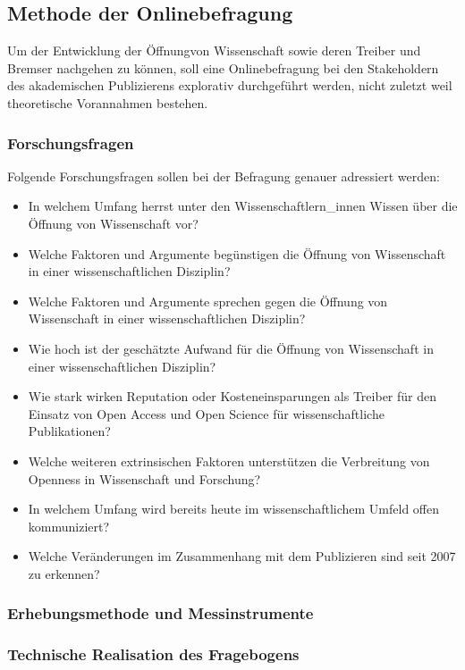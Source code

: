 \subsection{Methode der Onlinebefragung}
Um der Entwicklung der Öffnungvon Wissenschaft sowie deren Treiber und Bremser nachgehen zu können, soll eine Onlinebefragung bei den Stakeholdern des akademischen Publizierens explorativ durchgeführt werden, nicht zuletzt weil theoretische Vorannahmen bestehen.

\subsubsection{Forschungsfragen}
Folgende Forschungsfragen sollen bei der Befragung genauer adressiert werden:
\begin{itemize}
\item In welchem Umfang herrst unter den Wissenschaftlern_innen Wissen über die Öffnung von Wissenschaft vor? 
\item Welche Faktoren und Argumente begünstigen die Öffnung von Wissenschaft in einer wissenschaftlichen Disziplin? 
\item Welche Faktoren und Argumente sprechen gegen die Öffnung von Wissenschaft in einer wissenschaftlichen Disziplin? 
\item Wie hoch ist der geschätzte Aufwand für die Öffnung von Wissenschaft in einer wissenschaftlichen Disziplin? 
\item Wie stark wirken Reputation oder Kosteneinsparungen als Treiber für den Einsatz von Open Access und Open Science für wissenschaftliche Publikationen? 
\item Welche weiteren extrinsischen Faktoren unterstützen die Verbreitung von Openness in Wissenschaft und Forschung? 
\item In welchem Umfang wird bereits heute im wissenschaftlichem Umfeld offen kommuniziert?
\item Welche Veränderungen im Zusammenhang mit dem Publizieren sind seit 2007 zu erkennen?
\end{itemize}

\subsubsection{Erhebungsmethode und Messinstrumente}
\subsubsection{Technische Realisation des Fragebogens}